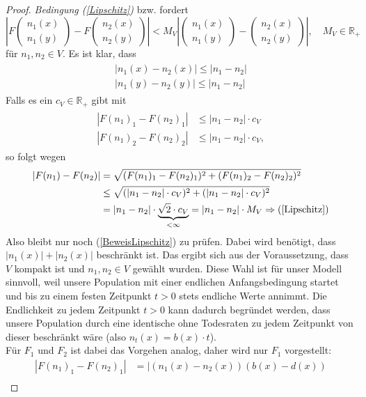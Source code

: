 \documentclass[11pt, a4paper, german]{article}
\theoremstyle{plain}
\newcommand{\tvec}[2]{\begin{pmatrix}#1\\#2\end{pmatrix}}
\begin{document}
\begin{proof}
		\textit{Bedingung (\ref{Lipschitz})} bzw. \cite[Kapitel 11 - \textbf{Thm 2.1} (2.7)]{ethier2009markov} fordert
		\[ \left| F\tvec{n_1(x)}{n_1(y)} - F\tvec{n_2(x)}{n_2(y)} \right| < M_V \left| \tvec{n_1(x)}{n_1(y)} - \tvec{n_2(x)}{n_2(y)} \right|, \quad M_V \in \mathbb{R}_{+} \]
		für $ n_1, n_2 \in V $. Es ist klar, dass
		\begin{align}
		\begin{split}
			|n_1(x) - n_2(x)| \le |n_1 - n_2|\\
			|n_1(y) - n_2(y)| \le |n_1 - n_2| \label{epsAbsch}
		\end{split}
		\end{align}
		Falls es ein $ c_V \in \mathbb{R}_{+} $ gibt mit
		\begin{align}
		\begin{split}
			|F(n_1)_1 - F(n_2)_1| &\le |n_1 - n_2| \cdot c_V\\
			|F(n_1)_2 - F(n_2)_2| &\le |n_1 - n_2| \cdot c_V, \label{BeweisLipschitz}
		\end{split}
		\end{align}
		so folgt wegen 
		\begin{align}
		\begin{split}
			|F(n_1) - F(n_2)| &= \sqrt{(F(n_1)_1 - F(n_2)_1)^2 + (F(n_1)_2 - F(n_2)_2)^2}\\
			&\le \sqrt{(|n_1 - n_2| \cdot c_V)^2 + (|n_1 - n_2| \cdot c_V)^2}\\
			&= |n_1 - n_2| \cdot \underbrace{\sqrt{2} \cdot c_V}_{< \infty} = |n_1 - n_2| \cdot M_V \Rightarrow (\ref{Lipschitz})
			\label{epsBehauptung}
		\end{split}
		\end{align}
		Also bleibt nur noch (\ref{BeweisLipschitz}) zu prüfen. Dabei wird benötigt, dass $ |n_1(x)| + |n_2(x)| $ beschränkt ist. Das ergibt sich aus der Voraussetzung, dass $ V $ kompakt ist und $ n_1, n_2 \in V $ gewählt wurden. Diese Wahl ist für unser Modell sinnvoll, weil unsere Population mit einer endlichen Anfangsbedingung startet und bis zu einem festen Zeitpunkt $ t > 0 $ stets endliche Werte annimmt. Die Endlichkeit zu jedem Zeitpunkt $ t > 0 $ kann dadurch begründet werden, dass unsere Population durch eine identische ohne Todesraten zu jedem Zeitpunkt von dieser beschränkt wäre (also $ n_t(x) = b(x) \cdot t $).\\
		Für $ F_1 $ und $ F_2 $ ist dabei das Vorgehen analog, daher wird nur $ F_1 $ vorgestellt:\\
		\begin{align*}
			|F(n_1)_1 - F(n_2)_1| & = |(n_1(x) - n_2(x))(b(x) - d(x)) \\

\end{align*}
\end{proof}
\end{document}
